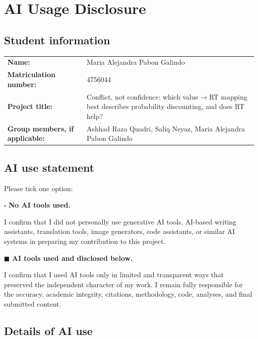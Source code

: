 \documentclass[11pt]{article}
\begin{document}
\section*{AI Usage Disclosure}

\subsection*{Student information}

\begin{tabularx}{\textwidth}{>{\bfseries}l X}
Name: & Maria Alejandra Pabon Galindo \\[0.6em]
Matriculation number: & 4756044 \\[0.6em]
Project title: & Conflict, not confidence: which value$\to$RT mapping best describes probability discounting, and does RT help? \\[0.6em]
Group members, if applicable: & Ashhad Raza Quadri, Saliq Neyaz, Maria Alejandra Pabon Galindo \\
\end{tabularx}

\bigskip

\subsection*{AI use statement}

Please tick one option:

\medskip

\noindent
$\square$ \textbf{No AI tools used.}

\noindent
I confirm that I did not personally use generative AI tools, AI-based writing
assistants, translation tools, image generators, code assistants, or similar AI
systems in preparing my contribution to this project.

\medskip

\noindent
$\blacksquare$ \textbf{AI tools used and disclosed below.}

\noindent
I confirm that I used AI tools only in limited and transparent ways that preserved
the independent character of my work. I remain fully responsible for the accuracy,
academic integrity, citations, methodology, code, analyses, and final submitted
content.

\bigskip

\subsection*{Details of AI use}
\end{document}

